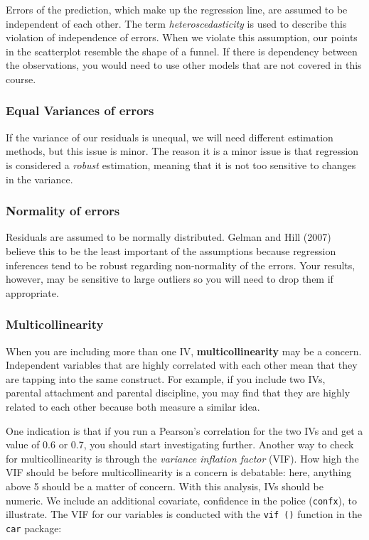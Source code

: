 \documentclass[
]{book}
\begin{document}
Errors of the prediction, which make up the regression line, are assumed to be independent of each other. The term \emph{heteroscedasticity} is used to describe this violation of independence of errors. When we violate this assumption, our points in the scatterplot resemble the shape of a funnel. If there is dependency between the observations, you would need to use other models that are not covered in this course.

\hypertarget{equal-variances-of-errors}{%
\subsubsection{Equal Variances of errors}\label{equal-variances-of-errors}}

If the variance of our residuals is unequal, we will need different estimation methods, but this issue is minor. The reason it is a minor issue is that regression is considered a \emph{robust} estimation, meaning that it is not too sensitive to changes in the variance.

\hypertarget{normality-of-errors}{%
\subsubsection{Normality of errors}\label{normality-of-errors}}

Residuals are assumed to be normally distributed. Gelman and Hill (2007) believe this to be the least important of the assumptions because regression inferences tend to be robust regarding non-normality of the errors. Your results, however, may be sensitive to large outliers so you will need to drop them if appropriate.

\hypertarget{multicollinearity}{%
\subsubsection{Multicollinearity}\label{multicollinearity}}

When you are including more than one IV, \textbf{multicollinearity} may be a concern. Independent variables that are highly correlated with each other mean that they are tapping into the same construct. For example, if you include two IVs, parental attachment and parental discipline, you may find that they are highly related to each other because both measure a similar idea.

One indication is that if you run a Pearson's correlation for the two IVs and get a value of 0.6 or 0.7, you should start investigating further. Another way to check for multicollinearity is through the \emph{variance inflation factor} (VIF). How high the VIF should be before multicollinearity is a concern is debatable: here, anything above 5 should be a matter of concern. With this analysis, IVs should be numeric. We include an additional covariate, confidence in the police (\texttt{confx}), to illustrate. The VIF for our variables is conducted with the \texttt{vif\ ()} function in the \texttt{car} package:
\end{document}
